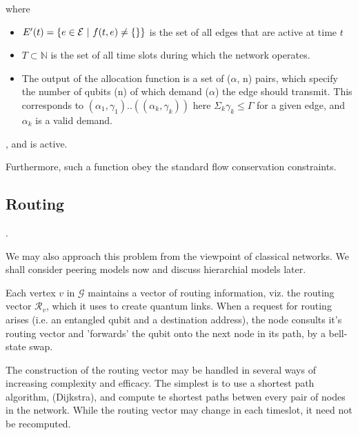 \documentclass{amsart}
\begin{document}
    where \begin{itemize}
        \item \(E'(t) = \left\{e \in \mathcal{E} \ |\  f(t, e) \neq \{\} \right\}\) is the set of all edges that are active at time \(t\)
        \item \(T \subset \mathbb{N}\) is the set of all time slots during which the network operates.
        \item The output of the allocation function is a set of (\(\alpha\), n) pairs, which specify the number of qubits (n) of which demand (\(\alpha\)) the edge should transmit. This corresponds to \((\alpha_1, \gamma_1)..((\alpha_k, \gamma_k))\) here \(\Sigma_k \gamma_k \leq \Gamma\) for a given edge, and \(\alpha_k\) is a valid demand.
    \end{itemize}, and is active.

    Furthermore, such a function obey the standard flow conservation constraints.

    \subsection{Routing}.

    We may also approach this problem from the viewpoint of classical networks. We shall consider peering models now and discuss hierarchial models later. 

    Each vertex \(v\) in \(\mathcal{G}\) maintains a vector of routing information, viz. the routing vector \(\mathcal{R}_v\), which it uses to create quantum links. When a request for routing arises (i.e. an entangled qubit and a destination address), the node consults it's routing vector and 'forwards' the qubit onto the next node in its path, by a bell-state swap. 

    The construction of the routing vector may be handled in several ways of increasing complexity and efficacy. The simplest is to use a shortest path algorithm, (Dijkstra), and compute te shortest paths betwen every pair of nodes in the network. While the routing vector may change in each timeslot, it need not be recomputed. 
    
\end{document}
